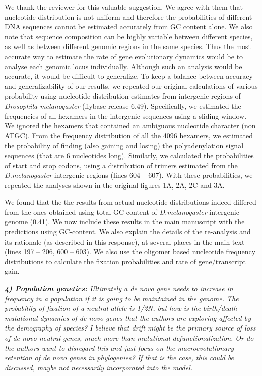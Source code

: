\documentclass[12pt,a4paper]{article}
\begin{document}
We thank the reviewer for this valuable suggestion. We agree with them that nucleotide distribution is not uniform and therefore the probabilities of different DNA sequences cannot be estimated accurately from GC content alone. We also note that sequence composition can be highly variable between different species, as well as between different genomic regions in the same species. Thus the most accurate way to estimate the rate of gene evolutionary dynamics would be to analyse each genomic locus individually. Although such an analysis would be accurate, it would be difficult to generalize. To keep a balance between accuracy and generalizability of our results, we repeated our original calculations of various probability using nucleotide distribution estimates from intergenic regions of \textit{Drosophila melanogaster}  (flybase release 6.49). Specifically, we estimated the frequencies of all hexamers in the intergenic sequences using a sliding window. We ignored the hexamers that contained an ambiguous nucleotide character (non ATGC). From the frequency distribution of all the 4096 hexamers, we estimated the probability of finding (also gaining and losing) the polyadenylation signal sequences (that are 6 nucleotides long). Similarly, we calculated the probabilities of start and stop codons, using a distribution of trimers estimated from the \textit{D.melanogaster} intergenic regions (lines 604 -- 607). With these probabilities, we repeated the analyses shown in the original figures 1A, 2A, 2C and 3A. 

We found that the the results from actual nucleotide distributions indeed differed from the ones obtained using total GC content of \textit{D.melanogaster} intergenic genome (0.41). We now include these results in the main manuscript with the predictions using GC-content. We also explain the details of the re-analysis and its rationale (as described in this response), at several places in the main text (lines 197 -- 206, 600 -- 603). We also use the oligomer based nucleotide frequency distributions to calculate the fixation probabilities and rate of gene/transcript gain.



{\itshape \textbf{4) Population genetics:} Ultimately a de novo gene needs to increase in frequency in a population if it is going to be maintained in the genome. The probability of fixation of a neutral allele is 1/2N, but how is the birth/death mutational dynamics of de novo genes that the authors are exploring affected by the demography of species? I believe that drift might be the primary source of loss of de novo neutral genes, much more than mutational defunctionalization. Or do the authors want to disregard this and just focus on the macroevolutionary retention of de novo genes in phylogenies? If that is the case, this could be discussed, maybe not necessarily incorporated into the model.}
\end{document}
